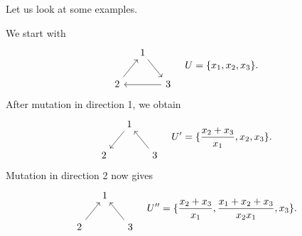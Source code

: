 \documentclass{article}
\begin{document}
Let us look at some examples.
\begin{example}
	We start with
	\begin{equation*}
		\begin{tikzcd}[column sep=small]
			& 1 \ar[dr]\\
			2 \ar[ur] && 3 \ar[ll]
		\end{tikzcd}
		\quad U = \{x_1, x_2, x_3\}.
	\end{equation*}
	After mutation in direction 1, we obtain
	\begin{equation*}
		\begin{tikzcd}[column sep=small]
			& 1 \ar[dr, leftarrow]\\
			2 \ar[ur, leftarrow] && 3
		\end{tikzcd}
		\quad U' = \{\frac{x_2 + x_3}{x_1}, x_2, x_3\}.
	\end{equation*}
	Mutation in direction 2 now gives
	\begin{equation*}
		\begin{tikzcd}[column sep=small]
			& 1 \ar[dr, leftarrow]\\
			2 \ar[ur] && 3
		\end{tikzcd}
		\quad U'' = \{\frac{x_2 + x_3}{x_1}, \frac{x_1 + x_2 + x_3}{x_2 x_1}, x_3\}.
	\end{equation*}
\end{example}
\end{document}
